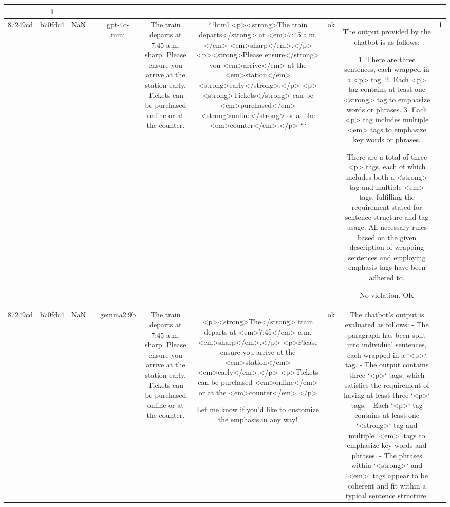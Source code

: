 \begin{table}[h!]
\begin{tabular}{|c|c|c|c|c|c|c|c|c|c|}
{{3. **Use of <em> tags**: Each <p> tag contains <em> tags to emphasize key words and phrases, which is in compliance with the description.

Overall, even though the number of <p> tags and the use of <em> tags comply, the issue with the number of <strong> tags per sentence leads to non-compliance.

ERR & 1\\
\hline
87249cd & b70fdc4 & NaN &  & gpt-4o-mini & The train departs at 7:45 a.m. sharp. Please ensure you arrive at the station early. Tickets can be purchased online or at the counter. & ```html
<p><strong>The train departs</strong> at <em>7:45 a.m.</em> <em>sharp</em>.</p>
<p><strong>Please ensure</strong> you <em>arrive</em> at the <em>station</em> <strong>early</strong>.</p>
<p><strong>Tickets</strong> can be <em>purchased</em> <strong>online</strong> or at the <em>counter</em>.</p>
``` & ok & The output provided by the chatbot is as follows:

1. There are three sentences, each wrapped in a <p> tag.
2. Each <p> tag contains at least one <strong> tag to emphasize words or phrases.
3. Each <p> tag includes multiple <em> tags to emphasize key words or phrases.

There are a total of three <p> tags, each of which includes both a <strong> tag and multiple <em> tags, fulfilling the requirement stated for sentence structure and tag usage. All necessary rules based on the given description of wrapping sentences and employing emphasis tags have been adhered to.

No violation.
OK & 1\\
\hline
87249cd & b70fdc4 & NaN &  & gemma2:9b & The train departs at 7:45 a.m. sharp. Please ensure you arrive at the station early. Tickets can be purchased online or at the counter. & <p><strong>The</strong> train departs at <em>7:45</em> a.m. <em>sharp</em>.</p>
<p>Please ensure you arrive at the <em>station</em> <em>early</em>.</p>
<p>Tickets can be purchased <em>online</em> or at the <em>counter</em>.</p> 


Let me know if you'd like to customize the emphasis in any way! & ok & The chatbot's output is evaluated as follows:
- The paragraph has been split into individual sentences, each wrapped in a `<p>` tag.
- The output contains three `<p>` tags, which satisfies the requirement of having at least three `<p>` tags.
- Each `<p>` tag contains at least one `<strong>` tag and multiple `<em>` tags to emphasize key words and phrases.
- The phrases within `<strong>` and `<em>` tags appear to be coherent and fit within a typical sentence structure.

}}
\end{tabular}
\end{table}
